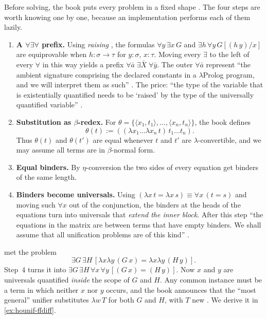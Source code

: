Before solving, the book puts every problem in a fixed shape . The four steps are worth knowing one by
one, because an implementation performs each of them lazily.
\begin{enumerate}
  \item \textbf{A $\forall\exists\forall$ prefix.} Using \emph{raising} , the formulas
    $\forall y\,\exists x\,G$ and $\exists h\,\forall y\,G[(h\,y)/x]$ are equiprovable when $h:\sigma\to\tau$ for
    $y:\sigma$, $x:\tau$. Moving every $\exists$ to the left of every $\forall$ in this way yields a prefix
    $\forall\bar a\;\exists\bar X\;\forall\bar y$. The outer $\forall\bar a$ represent \enquote{the ambient signature
    comprising the declared constants in a $\lambda$Prolog program, and we will interpret them as such}
    . The price: \enquote{the type of the variable that is existentially quantified needs to be
    \enquote{raised} by the type of the universally quantified variable} .
  \item \textbf{Substitution as $\beta$-redex.} For $\theta=\{\langle x_1,t_1\rangle,\dots,\langle x_n,t_n\rangle\}$,
    the book defines 
    \[\theta(t):=((\lambda x_1\dots\lambda x_n\,t)\,t_1\dots t_n).\]
    Thus $\theta(t)$ and
    $\theta(t')$ are equal whenever $t$ and $t'$ are $\lambda$-convertible, and we may assume all terms are in
    $\beta$-normal form.
  \item \textbf{Equal binders.} By $\eta$-conversion the two sides of every equation get binders of the same
    length.
  \item \textbf{Binders become universals.} Using $(\lambda x\,t=\lambda x\,s)\equiv\forall x\,(t=s)$ and moving
    such $\forall x$ out of the conjunction, the binders at the heads of the equations turn into universals that
    \emph{extend the inner block}. After this step \enquote{the equations in the matrix are between terms that
    have empty binders. We shall assume that all unification problems are of this kind} .
\end{enumerate}

\begin{example}\label{ex:hounif-ch4}
 met the problem 
\[\exists G\,\exists H\,[\lambda x\lambda y\,(G\,x)=\lambda x\lambda y\,(H\,y)].\]
Step~4 turns it into $\exists G\,\exists H\,\forall x\,\forall y\,[(G\,x)=(H\,y)]$. Now $x$ and $y$ are
universals quantified \emph{inside} the scope of $G$ and $H$. Any common instance must be a term in which
neither $x$ nor $y$ occurs, and the book announces that the \enquote{most general} unifier substitutes
$\lambda w\,T$ for both $G$ and $H$, with $T$ new . We derive it in \cref{ex:hounif-ffdiff}.
\end{example}

